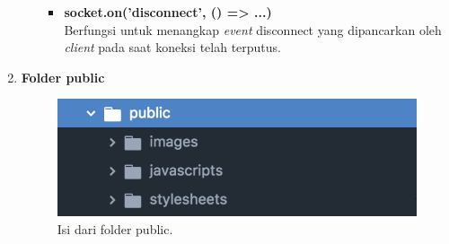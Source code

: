 \begin{enumerate}
\begin{enumerate}
\begin{itemize}
			\item \textbf{socket.on('disconnect', () => {...})} \\
			Berfungsi untuk menangkap \textit{event} disconnect yang dipancarkan oleh \textit{client} pada saat koneksi telah terputus.
 		\end{itemize}
	\end{enumerate}
	
	\item \textbf{Folder public} \\
	
	\begin{figure}[H]
		\centering
		\includegraphics[scale=0.4]{Gambar/direktori_public}
		\caption{Isi dari folder public.}
		\label{fig:direktori_public}
	\end{figure}
	

\end{enumerate}
